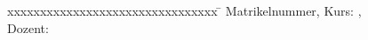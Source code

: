 \begin{titlepage}
\begin{center}
\vspace{1cm}


 

\end{center}
\begin{addmargin}[1cm]{0cm} %
\begin{tabbing}

xxxxxxxxxxxxxxxxxxxxxxxxxxxxxxxx	\=	\kill
Matrikelnummer, Kurs: 				\>	\matrikelnummer, \kurs					\\
Dozent:								\>	\dozent							\\	
\end{tabbing}
\end{addmargin}

\vfill

\end{titlepage}